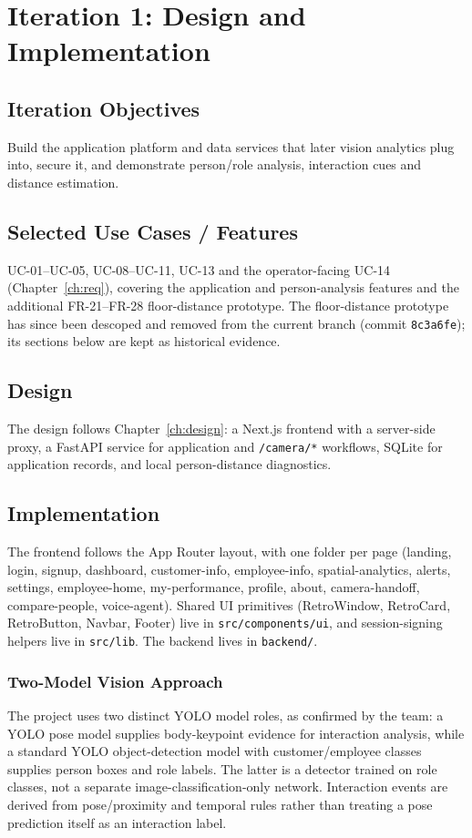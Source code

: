 \chapter{Iteration 1: Design and Implementation}
\label{ch:iter1}
\section{Iteration Objectives}
Build the application platform and data services that later vision analytics plug into, secure it, and demonstrate person/role analysis, interaction cues and distance estimation.

\section{Selected Use Cases / Features}
UC-01--UC-05, UC-08--UC-11, UC-13 and the operator-facing UC-14 (Chapter~\ref{ch:req}), covering the application and person-analysis features and the additional FR-21--FR-28 floor-distance prototype. The floor-distance prototype has since been descoped and removed from the current branch (commit \texttt{8c3a6fe}); its sections below are kept as historical evidence.

\section{Design}
The design follows Chapter~\ref{ch:design}: a Next.js frontend with a server-side proxy, a FastAPI service for application and \texttt{/camera/*} workflows, SQLite for application records, and local person-distance diagnostics.

\section{Implementation}
The frontend follows the App Router layout, with one folder per page (landing, login, signup, dashboard, customer-info, employee-info, spatial-analytics, alerts, settings, employee-home, my-performance, profile, about, camera-handoff, compare-people, voice-agent). Shared UI primitives (RetroWindow, RetroCard, RetroButton, Navbar, Footer) live in \texttt{src/components/ui}, and session-signing helpers live in \texttt{src/lib}. The backend lives in \texttt{backend/}.

\subsection{Two-Model Vision Approach}
The project uses two distinct YOLO model roles, as confirmed by the team: a YOLO pose model supplies body-keypoint evidence for interaction analysis, while a standard YOLO object-detection model with customer/employee classes supplies person boxes and role labels. The latter is a detector trained on role classes, not a separate image-classification-only network. Interaction events are derived from pose/proximity and temporal rules rather than treating a pose prediction itself as an interaction label.

